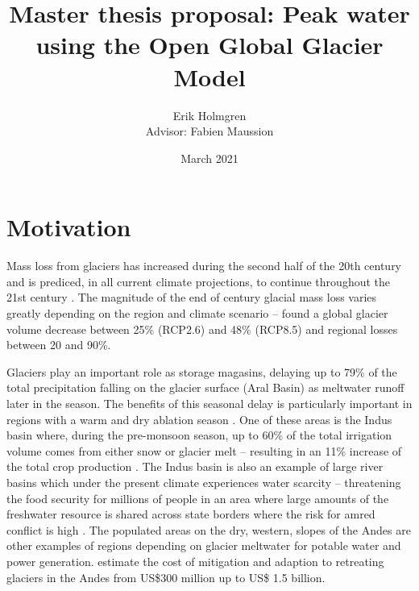 \documentclass[12pt, a4paper]{article}
\author{Erik Holmgren \\ Advisor: Fabien Maussion}
\title{Master thesis proposal: Peak water using the Open Global Glacier Model}
\date{March 2021}
\begin{document}
\maketitle
\noindent
\section{Motivation}
Mass loss from glaciers has increased during the second half of the 20th century
\parencite{vaughanObservationsCryosphere2013} and is prediced, in all current
climate projections, to continue throughout the 21st century
\parencite{ipccClimateChange20142014}. The magnitude of the end of century
glacial mass loss varies greatly depending on the region and climate scenario --
\textcite{hussNewModelGlobal2015} found a global glacier volume decrease between
25\% (RCP2.6) and 48\% (RCP8.5) and regional losses between 20 and 90\%.



Glaciers play an important role as storage magasins, delaying up to 79\% of the
total precipitation falling on the glacier surface (Aral Basin) as meltwater
runoff later in the season. The benefits of this seasonal delay is particularly
important in regions with a warm and dry ablation season
\parencite{kaserContributionPotentialGlaciers2010}. One of these areas is the
Indus basin where, during the pre-monsoon season, up to 60\% of the total
irrigation volume comes from either snow or glacier melt -- resulting in an 11\%
increase of the total crop production
\parencite{biemansImportanceSnowGlacier2019}. The Indus basin is also an example
of large river basins which under the present climate experiences water scarcity
-- threatening the food security for millions of people
\parencite{kummuClimatedrivenInterannualVariability2014} in an area where large
amounts of the freshwater resource is shared across state borders where the risk
for amred conflict is high \parencite{schleussnerArmedconflictRisksEnhanced2016,
pritchardAsiaShrinkingGlaciers2019}. The populated areas on the dry, western,
slopes of the Andes are other examples of regions depending on glacier meltwater
for potable water and power generation.
\textcite{vergaraEconomicImpactsRapid2007} estimate the cost of mitigation and
adaption to retreating glaciers in the Andes from US\$300 million up to US\$
1.5 billion.
\end{document}
